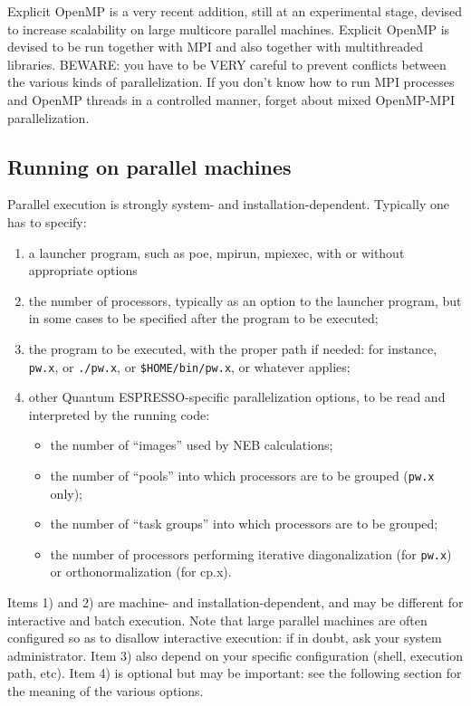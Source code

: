 \documentclass[12pt,a4paper]{article}
\def\qe{{\sc Quantum ESPRESSO}}
\def\pw.x{\texttt{pw.x}}
\begin{document}
Explicit OpenMP is a very recent addition, still at an 
experimental stage, devised to increase scalability on
large multicore parallel machines. Explicit OpenMP is 
devised to be run together with MPI and also together 
with multithreaded libraries. BEWARE: you have to be VERY 
careful to prevent conflicts between the various kinds of
parallelization. If you don't know how to run MPI processes
and OpenMP threads in a controlled manner, forget about mixed 
OpenMP-MPI parallelization.

\subsection{Running on parallel machines}
\label{SubSec:para}

Parallel execution is strongly system- and installation-dependent. 
Typically one has to specify:
\begin{enumerate}
\item a launcher program, such as poe, mpirun, mpiexec, with or
  without  appropriate options 
\item the number of processors, typically as an option to the launcher
  program,  but in some cases to be specified after the program to be
  executed; 
\item the program to be executed, with the proper path if needed: for
  instance, \pw.x, or \texttt{./pw.x}, or \texttt{\$HOME/bin/pw.x}, or
  whatever applies; 
\item other \qe-specific parallelization options, to be
  read and interpreted by the running code: 
\begin{itemize}
\item the number of ``images'' used by NEB calculations;
\item the number of ``pools'' into which processors are to be grouped
  (\pw.x only);
\item the number of ``task groups'' into which processors are to be
  grouped;
\item the number of processors performing iterative diagonalization
  (for \pw.x) or orthonormalization (for cp.x).
\end{itemize}
\end{enumerate}
Items 1) and 2) are machine- and installation-dependent, and may be 
different for interactive and batch execution. Note that large
parallel machines are  often configured so as to disallow interactive
execution: if in doubt, ask your system administrator.
Item 3) also depend on your specific configuration (shell, execution
path, etc). 
Item 4) is optional but may be important: see the following section
for the meaning of the various options.
\end{document}
